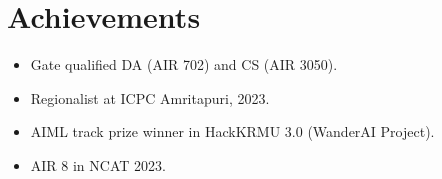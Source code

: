 \documentclass[a4paper,11pt]{article}
\begin{document}
\section*{Achievements}
\vspace{-2mm}
\begin{itemize}[label=\textbullet, left=0pt, itemsep=0pt,parsep=0pt,topsep=0pt,partopsep=0pt]
    \item Gate qualified DA (AIR 702) and CS (AIR 3050).
    \item Regionalist at ICPC Amritapuri, 2023.
    \item AIML track prize winner in HackKRMU 3.0 (WanderAI Project).
    \item AIR 8 in NCAT 2023.
\end{itemize}
\vspace{-5mm}

\end{document}
